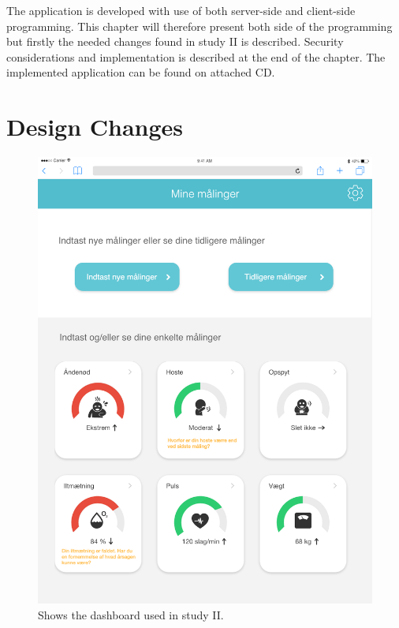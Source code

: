 The application is developed with use of both server-side and client-side programming. This chapter will therefore present both side of the programming but firstly the needed changes found in study II is described. Security considerations and implementation is described at the end of the chapter. The implemented application can be found on attached CD.

\section{Design Changes}

\begin{figure}[h]
  \centering
  \begin{minipage}[b]{0.45\textwidth}
    \includegraphics[width=\textwidth]{images/study2/Dashboard.png}
    \caption{Shows the dashboard used in study II.}
    \label{fig:db1st}
  \end{minipage}
  \hfill
  \begin{minipage}[b]{0.45\textwidth}

\end{minipage}
\end{figure}
